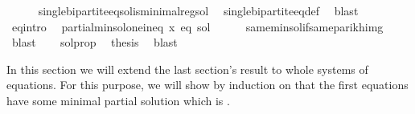 \begin{isabellebody}
\ \ \ \ \isamarkupfalse%
\ single{\isacharunderscore}{\kern0pt}bipartite{\isacharunderscore}{\kern0pt}eq{\isachardot}{\kern0pt}sol{\isacharunderscore}{\kern0pt}is{\isacharunderscore}{\kern0pt}minimal{\isacharunderscore}{\kern0pt}reg{\isacharunderscore}{\kern0pt}sol\ \isamarkupfalse%
\ single{\isacharunderscore}{\kern0pt}bipartite{\isacharunderscore}{\kern0pt}eq{\isacharunderscore}{\kern0pt}def\ \isamarkupfalse%
\ blast\isanewline
\ \ \isamarkupfalse%
\ eq{\isacharprime}{\kern0pt}{\isacharunderscore}{\kern0pt}intro\ \isamarkupfalse%
\ {\isachardoublequoteopen}partial{\isacharunderscore}{\kern0pt}min{\isacharunderscore}{\kern0pt}sol{\isacharunderscore}{\kern0pt}one{\isacharunderscore}{\kern0pt}ineq\ x\ eq\ {\isacharquery}{\kern0pt}sol{\isachardoublequoteclose}\isanewline
\ \ \ \ \isamarkupfalse%
\ same{\isacharunderscore}{\kern0pt}min{\isacharunderscore}{\kern0pt}sol{\isacharunderscore}{\kern0pt}if{\isacharunderscore}{\kern0pt}same{\isacharunderscore}{\kern0pt}parikh{\isacharunderscore}{\kern0pt}img\ \isamarkupfalse%
\ blast\isanewline
\ \ \isamarkupfalse%
\ sol{\isacharunderscore}{\kern0pt}prop\ \isamarkupfalse%
\ {\isacharquery}{\kern0pt}thesis\ \isamarkupfalse%
\ blast\isanewline
{}\isamarkupfalse%
%
\endisatagproof
{\isafoldproof}%
%
\isadelimproof
%
\endisadelimproof
%
\isadelimdocument
%
\endisadelimdocument
%
\isatagdocument
%
\isamarkuptrue%
%
\endisatagdocument
{\isafolddocument}%
%
\isadelimdocument
%
\endisadelimdocument
%
\begin{isamarkuptext}%
In this section we will extend the last section's result to whole systems of equations.
For this purpose, we will show by induction on  that the first  equations have
some minimal partial solution which is .


\end{isamarkuptext}
\end{isabellebody}
